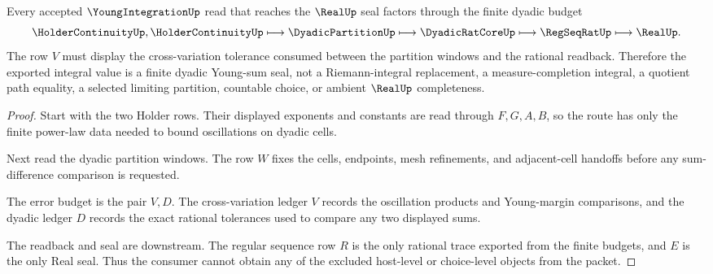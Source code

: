 \begin{theorem}
\label{thm:young-integration-dyadic-error-budget}
Every accepted $\YoungIntegrationUp$ read that reaches the $\RealUp$ seal factors through the finite dyadic budget
$$
\HolderContinuityUp,\HolderContinuityUp \longmapsto \DyadicPartitionUp \longmapsto \DyadicRatCoreUp \longmapsto \RegSeqRatUp \longmapsto \RealUp .
$$
The row $V$ must display the cross-variation tolerance consumed between the partition windows and the rational readback. Therefore the exported integral value is a finite dyadic Young-sum seal, not a Riemann-integral replacement, a measure-completion integral, a quotient path equality, a selected limiting partition, countable choice, or ambient $\RealUp$ completeness.
\end{theorem}
\begin{proof}
Start with the two Holder rows. Their displayed exponents and constants are read through $F,G,A,B$, so the route has only the finite power-law data needed to bound oscillations on dyadic cells.

Next read the dyadic partition windows. The row $W$ fixes the cells, endpoints, mesh refinements, and adjacent-cell handoffs before any sum-difference comparison is requested.

The error budget is the pair $V,D$. The cross-variation ledger $V$ records the oscillation products and Young-margin comparisons, and the dyadic ledger $D$ records the exact rational tolerances used to compare any two displayed sums.

The readback and seal are downstream. The regular sequence row $R$ is the only rational trace exported from the finite budgets, and $E$ is the only Real seal. Thus the consumer cannot obtain any of the excluded host-level or choice-level objects from the packet.
\end{proof}


